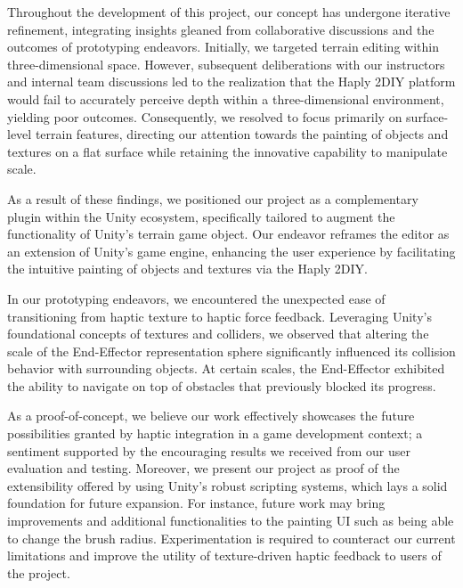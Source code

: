 Throughout the development of this project, our concept has undergone iterative refinement, integrating insights gleaned from collaborative discussions and the outcomes of prototyping endeavors. 
Initially, we targeted terrain editing within three-dimensional space. 
However, subsequent deliberations with our instructors and internal team discussions led to the realization that the Haply 2DIY platform would fail to accurately perceive depth within a three-dimensional environment, yielding poor outcomes. 
Consequently, we resolved to focus primarily on surface-level terrain features, directing our attention towards the painting of objects and textures on a flat surface while retaining the innovative capability to manipulate scale.

As a result of these findings, we positioned our project as a complementary plugin within the Unity ecosystem, specifically tailored to augment the functionality of Unity's terrain game object. 
Our endeavor reframes the editor as an extension of Unity's game engine, enhancing the user experience by facilitating the intuitive painting of objects and textures via the Haply 2DIY.

In our prototyping endeavors, we encountered the unexpected ease of transitioning from haptic texture to haptic force feedback. 
Leveraging Unity's foundational concepts of textures and colliders, we observed that altering the scale of the End-Effector representation sphere significantly influenced its collision behavior with surrounding objects. 
At certain scales, the End-Effector exhibited the ability to navigate on top of obstacles that previously blocked its progress.

As a proof-of-concept, we believe our work effectively showcases the future possibilities granted by haptic integration in a game development context; a sentiment supported by the encouraging results we received from our user evaluation and testing.
Moreover, we present our project as proof of the extensibility offered by using Unity's robust scripting systems, which lays a solid foundation for future expansion. 
For instance, future work may bring improvements and additional functionalities to the painting UI such as being able to change the brush radius. Experimentation is required to counteract our current limitations and improve the utility of texture-driven haptic feedback to users of the project.